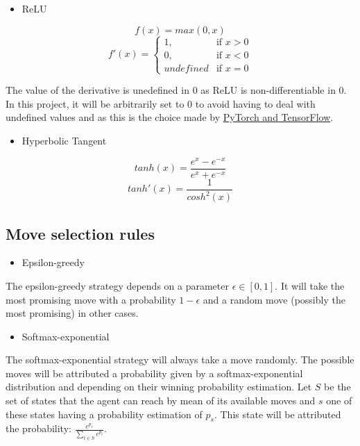 \documentclass{article}
\newcommand\ddfrac[2]{\frac{\displaystyle #1}{\displaystyle #2}}
\begin{document}
\begin{itemize}
    \item ReLU
\end{itemize}

$$ f(x) =  max(0, x)  $$
\[
    f'(x)=
\begin{cases}
    1,         & \text{if } x > 0\\
    0,         & \text{if } x < 0\\
    undefined & \text{if } x = 0
\end{cases}
\]

The value of the derivative is unedefined in $0$ as ReLU is non-differentiable in $0$. In this project, it will be arbitrarily set to 0 to avoid having to deal with undefined values and as this is the choice made by \href{https://hal.archives-ouvertes.fr/hal-03265059v2/document\#:~:text=The\%20value\%20of\%20the\%20derivative,the\%20subgradient\%20from\%20convex\%20analysis}{PyTorch and TensorFlow}.

\begin{itemize}
    \item Hyperbolic Tangent
\end{itemize}

$$ tanh(x) =  \frac{e^{x} - e^{-x}}{e^{x} + e^{-x}}  $$
$$ tanh'(x) = \frac{1}{cosh^{2}(x)}  $$

\subsection{Move selection rules}

\begin{itemize}
    \item Epsilon-greedy
\end{itemize}

The epsilon-greedy strategy depends on a parameter $\epsilon \in [0, 1]$. It will take the most promising move with a probability $1 - \epsilon$ and a random move (possibly the most promising) in other cases.

\begin{itemize}
    \item Softmax-exponential
\end{itemize}

The softmax-exponential strategy will always take a move randomly. The possible moves will be attributed a probability given by a softmax-exponential distribution and depending on their winning probability estimation. Let $S$ be the set of states that the agent can reach by mean of its available moves and $s$ one of these states having a probability estimation of $p_{s}$. This state will be attributed the probability: $\ddfrac{e^{p_{s}}}{\sum_{t \in S}{e^{p_{t}}}}$.
\end{document}
